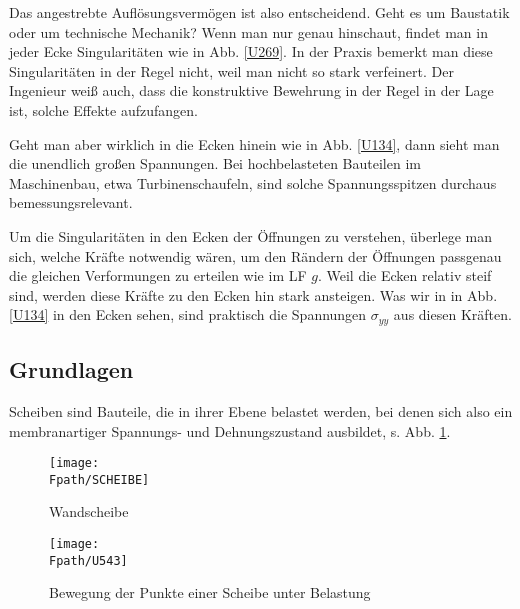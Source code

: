 {Das angestrebte Aufl\"{o}sungsverm\"{o}gen ist also entscheidend. Geht es um Baustatik oder um technische Mechanik? Wenn man nur genau hinschaut, findet man in jeder Ecke Singularit\"{a}ten wie in Abb. \ref{U269}. In der Praxis bemerkt man diese Singularit\"{a}ten in der Regel nicht, weil man nicht so stark verfeinert. Der Ingenieur wei{\ss} auch, dass die konstruktive Bewehrung in der Regel in der Lage ist, solche Effekte aufzufangen.

Geht man aber wirklich in die Ecken hinein wie in Abb. \ref{U134}, dann sieht man die unendlich gro{\ss}en Spannungen. Bei hochbelasteten Bauteilen im Maschinenbau, etwa Turbinenschaufeln, sind solche Spannungsspitzen durchaus bemessungsrelevant.

Um die Singularit\"{a}ten in den Ecken der \"{O}ffnungen zu verstehen, \"{u}berlege man sich, welche Kr\"{a}fte notwendig w\"{a}ren, um den R\"{a}ndern der \"{O}ffnungen passgenau die gleichen Verformungen zu erteilen wie im LF $g$. Weil die Ecken relativ steif sind, werden diese Kr\"{a}fte zu den Ecken hin stark ansteigen. Was wir in in Abb. \ref{U134} in den Ecken sehen, sind praktisch die Spannungen $\sigma_{yy}$ aus diesen Kr\"{a}ften.


{\textcolor{sectionTitleBlue}{\section{Grundlagen}}}\label{Grundlagen}
Scheiben sind Bauteile, die in ihrer Ebene belastet werden,  bei denen sich also ein membranartiger Spannungs- und Dehnungszustand ausbildet, s. Abb. \ref{Scheibe41}.


\begin{figure}[tbp] \centering
\if {} \sidecaption \fi
\texttt{[image: \\Fpath/SCHEIBE]}
\caption{Wandscheibe} \label{Scheibe41}
\end{figure}%

\begin{figure}[tbp] \centering
\if {} \sidecaption \fi
\texttt{[image: \\Fpath/U543]}%
\caption{Bewegung der Punkte einer Scheibe unter Belastung} \label{U543}
\end{figure}%




}
